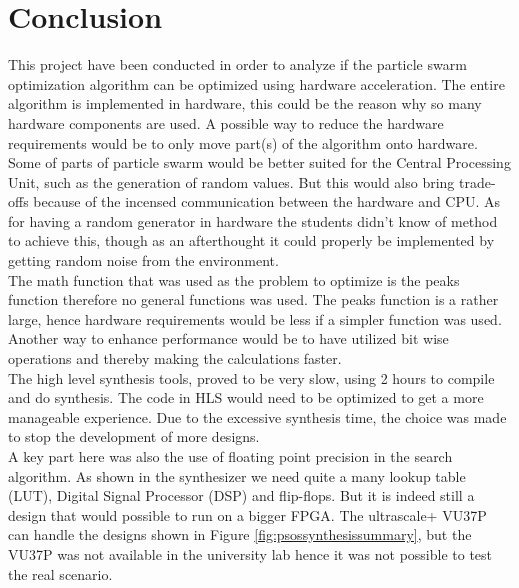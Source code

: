 \section{Conclusion}\label{sc:conclusion}
This project have been conducted in order to analyze if the particle swarm optimization algorithm can be optimized using hardware acceleration. The entire algorithm is implemented in hardware, this could be the reason why so many hardware components are used. A possible way to reduce the hardware requirements would be to only move part(s) of the algorithm onto hardware. Some of parts of particle swarm would be better suited for the Central Processing Unit, such as the generation of random values. But this would also bring trade-offs because of the incensed communication between the hardware and CPU. As for having a random generator in hardware the students didn't know of method to achieve this, though as an afterthought it could properly be implemented by getting random noise from the environment.\\

The math function that was used as the problem to optimize is the peaks function therefore no general functions was used. The peaks function is a rather large, hence hardware requirements would be less if a simpler function was used. Another way to enhance performance would be to have utilized bit wise operations and thereby making the calculations faster.\\

The high level synthesis tools, proved to be very slow, using 2 hours to compile and do synthesis. The code in HLS would need to be optimized to get a more manageable experience. Due to the excessive synthesis time, the choice was made to stop the development of more designs.\\

A key part here was also the use of floating point precision in the search algorithm. As shown in the synthesizer we need quite a many lookup table (LUT), Digital Signal Processor (DSP) and flip-flops. But it is indeed still a design that would possible to run on a bigger FPGA. The ultrascale+ VU37P can handle the designs shown in Figure \ref{fig:psossynthesissummary}, but the VU37P was not available in the university lab hence it was not possible to test the real scenario.